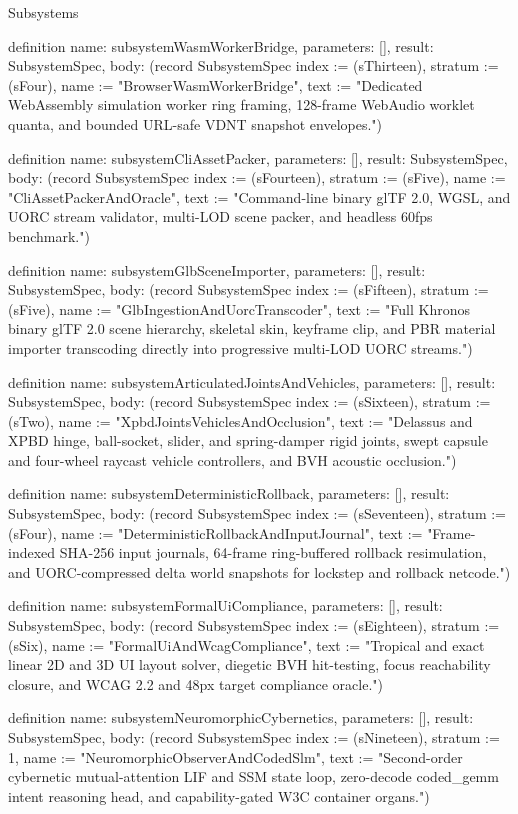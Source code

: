\begin{lexlean}{Subsystems}
\begin{semanticmodule}
definition{
  name: subsystemWasmWorkerBridge,
  parameters: [],
  result: SubsystemSpec,
  body: (record SubsystemSpec {index := (sThirteen), stratum := (sFour), name := "BrowserWasmWorkerBridge", text := "Dedicated WebAssembly simulation worker ring framing, 128-frame WebAudio worklet quanta, and bounded URL-safe VDNT snapshot envelopes."})
}

definition{
  name: subsystemCliAssetPacker,
  parameters: [],
  result: SubsystemSpec,
  body: (record SubsystemSpec {index := (sFourteen), stratum := (sFive), name := "CliAssetPackerAndOracle", text := "Command-line binary glTF 2.0, WGSL, and UORC stream validator, multi-LOD scene packer, and headless 60fps benchmark."})
}

definition{
  name: subsystemGlbSceneImporter,
  parameters: [],
  result: SubsystemSpec,
  body: (record SubsystemSpec {index := (sFifteen), stratum := (sFive), name := "GlbIngestionAndUorcTranscoder", text := "Full Khronos binary glTF 2.0 scene hierarchy, skeletal skin, keyframe clip, and PBR material importer transcoding directly into progressive multi-LOD UORC streams."})
}

definition{
  name: subsystemArticulatedJointsAndVehicles,
  parameters: [],
  result: SubsystemSpec,
  body: (record SubsystemSpec {index := (sSixteen), stratum := (sTwo), name := "XpbdJointsVehiclesAndOcclusion", text := "Delassus and XPBD hinge, ball-socket, slider, and spring-damper rigid joints, swept capsule and four-wheel raycast vehicle controllers, and BVH acoustic occlusion."})
}

definition{
  name: subsystemDeterministicRollback,
  parameters: [],
  result: SubsystemSpec,
  body: (record SubsystemSpec {index := (sSeventeen), stratum := (sFour), name := "DeterministicRollbackAndInputJournal", text := "Frame-indexed SHA-256 input journals, 64-frame ring-buffered rollback resimulation, and UORC-compressed delta world snapshots for lockstep and rollback netcode."})
}

definition{
  name: subsystemFormalUiCompliance,
  parameters: [],
  result: SubsystemSpec,
  body: (record SubsystemSpec {index := (sEighteen), stratum := (sSix), name := "FormalUiAndWcagCompliance", text := "Tropical and exact linear 2D and 3D UI layout solver, diegetic BVH hit-testing, focus reachability closure, and WCAG 2.2 and 48px target compliance oracle."})
}

definition{
  name: subsystemNeuromorphicCybernetics,
  parameters: [],
  result: SubsystemSpec,
  body: (record SubsystemSpec {index := (sNineteen), stratum := 1, name := "NeuromorphicObserverAndCodedSlm", text := "Second-order cybernetic mutual-attention LIF and SSM state loop, zero-decode coded_gemm intent reasoning head, and capability-gated W3C container organs."})
}


\end{semanticmodule}
\end{lexlean}
